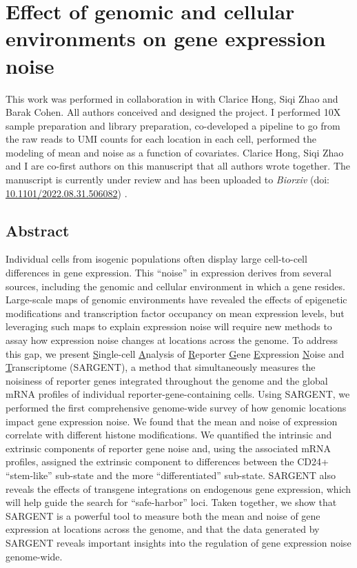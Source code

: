 \chapter{Effect of genomic and cellular environments on gene expression noise}
\label{chap:cas}

This work was performed in collaboration in with Clarice Hong, Siqi Zhao and Barak Cohen. All authors conceived and designed the project. I performed 10X sample preparation and library preparation, co-developed a pipeline to go from the raw reads to UMI counts for each location in each cell, performed the modeling of mean and noise as a function of covariates. Clarice Hong, Siqi Zhao and I are co-first authors on this manuscript that all authors wrote together. The manuscript is currently under review and has been uploaded to \textit{Biorxiv} (doi: \href{https://www.biorxiv.org/content/10.1101/2022.08.31.506082v1}{10.1101/2022.08.31.506082}) \cite{hongcky_cohenba:EffectGenomic2022}.

\section{Abstract}

Individual cells from isogenic populations often display large cell-to-cell differences in gene expression. This \enquote{noise} in expression derives from several sources, including the genomic and cellular environment in which a gene resides. Large-scale maps of genomic environments have revealed the effects of epigenetic modifications and transcription factor occupancy on mean expression levels, but leveraging such maps to explain expression noise will require new methods to assay how expression noise changes at locations across the genome. To address this gap, we present \underline{S}ingle-cell \underline{A}nalysis of \underline{R}eporter \underline{G}ene \underline{E}xpression \underline{N}oise and \underline{T}ranscriptome (SARGENT), a method that simultaneously measures the noisiness of reporter genes integrated throughout the genome and the global mRNA profiles of individual reporter-gene-containing cells. Using SARGENT, we performed the first comprehensive genome-wide survey of how genomic locations impact gene expression noise. We found that the mean and noise of expression correlate with different histone modifications. We quantified the intrinsic and extrinsic components of reporter gene noise and, using the associated mRNA profiles, assigned the extrinsic component to differences between the CD24+ \enquote{stem-like} sub-state and the more \enquote{differentiated} sub-state. SARGENT also reveals the effects of transgene integrations on endogenous gene expression, which will help guide the search for \enquote{safe-harbor} loci. Taken together, we show that SARGENT is a powerful tool to measure both the mean and noise of gene expression at locations across the genome, and that the data generated by SARGENT reveals important insights into the regulation of gene expression noise genome-wide. 

